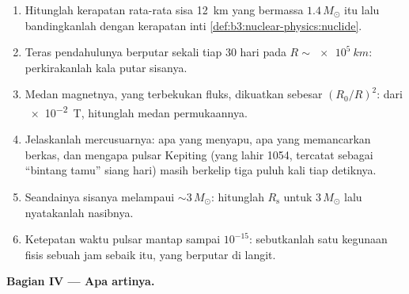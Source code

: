 \begin{problem}
\begin{enumerate}[resume]
  \item Hitunglah kerapatan rata-rata sisa \qty{12}{km} yang
        bermassa $1.4\,M_\odot$ itu lalu bandingkanlah dengan kerapatan
        inti \cref{def:b3:nuclear-physics:nuclide}.
  \item Teras pendahulunya berputar sekali tiap 30 hari pada
        $R \sim \qty{e5}{km}$: perkirakanlah kala putar sisanya.
  \item Medan magnetnya, yang terbekukan fluks, dikuatkan sebesar
        $(R_0/R)^2$: dari \qty{e-2}{T}, hitunglah medan
        permukaannya.
  \item Jelaskanlah mercusuarnya: apa yang menyapu, apa yang memancarkan berkas, dan
        mengapa pulsar Kepiting (yang lahir 1054, tercatat sebagai ``bintang
        tamu'' siang hari) masih berkelip tiga puluh kali tiap detiknya.
  \item Seandainya sisanya melampaui ${\sim}3\,M_\odot$: hitunglah
        $R_{\text{s}}$ untuk $3\,M_\odot$ lalu nyatakanlah nasibnya.
  \item Ketepatan waktu pulsar mantap sampai $10^{-15}$: sebutkanlah satu kegunaan
        fisis sebuah jam sebaik itu, yang berputar di langit.
\end{enumerate}

\medskip\noindent\textbf{Bagian IV --- Apa artinya.}


\end{problem}
